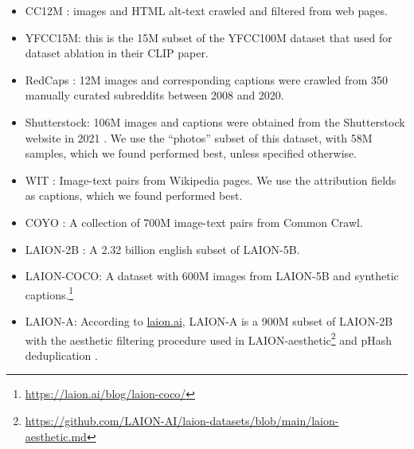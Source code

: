 \begin{itemize}[leftmargin=6pt,topsep=0pt,itemsep=0pt,parsep=4pt]
\item CC12M \cite{changpinyo2021conceptual}: images and HTML alt-text crawled and filtered from web pages.
\item YFCC15M: this is the 15M subset of the YFCC100M dataset \cite{yfcc100m} that \citet{radford2021learning} used for dataset ablation in their CLIP paper.
\item RedCaps \cite{desai2021redcaps}: 12M images and corresponding captions were crawled from 350 manually curated subreddits between 2008 and 2020.
\item Shutterstock: 106M images and captions were obtained from the Shutterstock website in 2021 \cite{nguyen2022quality}. We use the ``photos'' subset of this dataset, with 58M samples, which we found performed best, unless specified otherwise.
\item WIT \cite{srinivasan2021wit}:  Image-text pairs from Wikipedia pages. We use the attribution fields as captions, which we found performed best.
\item COYO \cite{coyo700m}: A collection of 700M image-text pairs from Common Crawl.
\item LAION-2B \cite{laion5b}: A 2.32 billion english subset of LAION-5B.
\item LAION-COCO: A dataset with 600M images from LAION-5B and synthetic captions.\footnote{\url{https://laion.ai/blog/laion-coco/}}
\item LAION-A: According to \href{https://laion.ai/}{laion.ai}, LAION-A is a 900M subset of LAION-2B \cite{laion5b} with the aesthetic filtering procedure used in LAION-aesthetic\footnote{\url{https://github.com/LAION-AI/laion-datasets/blob/main/laion-aesthetic.md}} and pHash deduplication \cite{idealods2019imagededup}.
\end{itemize}


\begin{table}
\caption{Measuring the quality of external data sources}
    \renewcommand{\arraystretch}{1.1}
\setlength\tabcolsep{4pt}
\small
\centering
{}
\label{tab:app_byod_quality}
\end{table}

